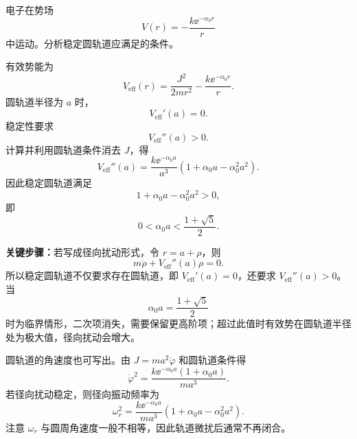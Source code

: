 \begin{question}
电子在势场
\[
  V(r)=-\frac{k\ee^{-\alpha_0 r}}{r}
\]
中运动。分析稳定圆轨道应满足的条件。

\begin{solution}
有效势能为
\[
  V_{\mathrm{eff}}(r)=\frac{J^2}{2mr^2}-\frac{k\ee^{-\alpha_0 r}}{r}.
\]
圆轨道半径为 $a$ 时，
\[
  V_{\mathrm{eff}}'(a)=0.
\]
稳定性要求
\[
  V_{\mathrm{eff}}''(a)>0.
\]
计算并利用圆轨道条件消去 $J$，得
\[
  V_{\mathrm{eff}}''(a)=\frac{k\ee^{-\alpha_0a}}{a^3}
  \left(1+\alpha_0a-\alpha_0^2a^2\right).
\]
因此稳定圆轨道满足
\[
  \boxed{1+\alpha_0a-\alpha_0^2a^2>0},
\]
即
\[
  \boxed{0<\alpha_0a<\frac{1+\sqrt5}{2}}.
\]


\medskip
\textbf{关键步骤：}若写成径向扰动形式，令 $r=a+\rho$，则
\[
  m\ddot\rho+V_{\mathrm{eff}}''(a)\rho=0.
\]
所以稳定圆轨道不仅要求存在圆轨道，即 $V_{\mathrm{eff}}'(a)=0$，还要求 $V_{\mathrm{eff}}''(a)>0$。当
\[
  \alpha_0a=\frac{1+\sqrt5}{2}
\]
时为临界情形，二次项消失，需要保留更高阶项；超过此值时有效势在圆轨道半径处为极大值，径向扰动会增大。


\medskip
圆轨道的角速度也可写出。由 $J=ma^2\dot\varphi$ 和圆轨道条件得
\[
  \dot\varphi^2=\frac{k\ee^{-\alpha_0a}(1+\alpha_0a)}{ma^3}.
\]
若径向扰动稳定，则径向振动频率为
\[
  \omega_r^2=\frac{k\ee^{-\alpha_0a}}{ma^3}
  (1+\alpha_0a-\alpha_0^2a^2).
\]
注意 $\omega_r$ 与圆周角速度一般不相等，因此轨道微扰后通常不再闭合。
\end{solution}
\end{question}
